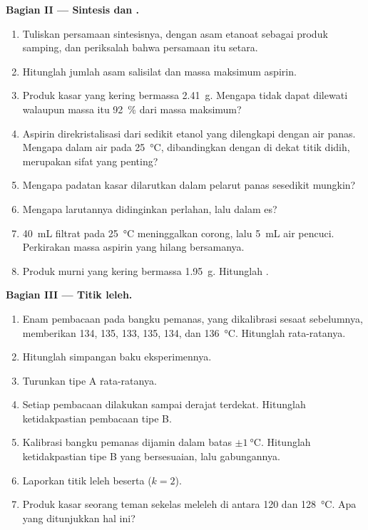 \begin{problem}
\noindent\textbf{Bagian II --- Sintesis dan .}
\begin{enumerate}[resume]
  \item Tuliskan persamaan sintesisnya, dengan asam etanoat 
        sebagai produk samping, dan periksalah bahwa persamaan itu setara.
  \item Hitunglah jumlah asam salisilat dan massa maksimum aspirin.
  \item Produk kasar yang kering bermassa \qty{2.41}{g}. Mengapa
         tidak dapat dilewati walaupun massa itu
        \qty{92}{\percent} dari massa maksimum?
  \item Aspirin direkristalisasi dari sedikit etanol yang dilengkapi
        dengan air panas. Mengapa  dalam air pada
        \qty{25}{\celsius}, dibandingkan dengan  di dekat titik
        didih, merupakan sifat yang penting?
  \item Mengapa padatan kasar dilarutkan dalam pelarut panas sesedikit
        mungkin?
  \item Mengapa larutannya didinginkan perlahan, lalu dalam es?
  \item \qty{40}{mL} filtrat pada \qty{25}{\celsius} meninggalkan corong,
        lalu \qty{5}{mL} air pencuci. Perkirakan massa aspirin yang hilang
        bersamanya.
  \item Produk murni yang kering bermassa \qty{1.95}{g}. Hitunglah
        .
\end{enumerate}

\noindent\textbf{Bagian III --- Titik leleh.}
\begin{enumerate}[resume]
  \item Enam pembacaan pada bangku pemanas, yang dikalibrasi sesaat
        sebelumnya, memberikan 134, 135, 133, 135, 134, dan
        \qty{136}{\celsius}. Hitunglah rata-ratanya.
  \item Hitunglah simpangan baku eksperimennya.
  \item Turunkan  tipe A rata-ratanya.
  \item Setiap pembacaan dilakukan sampai derajat terdekat. Hitunglah
        ketidakpastian pembacaan tipe B.
  \item Kalibrasi bangku pemanas dijamin dalam batas
        $\pm\qty{1}{\celsius}$. Hitunglah ketidakpastian tipe B yang
        bersesuaian, lalu  gabungannya.
  \item Laporkan titik leleh beserta  ($k = 2$).
  \item Produk kasar seorang teman sekelas meleleh di antara 120 dan
        \qty{128}{\celsius}. Apa yang ditunjukkan hal ini?
\end{enumerate}


\end{problem}

